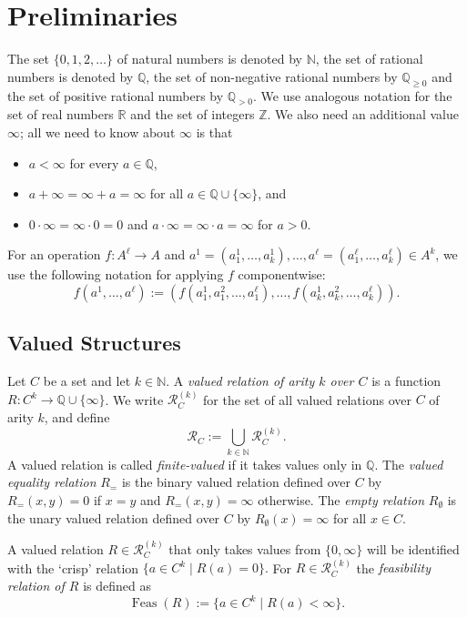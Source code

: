 \documentclass[nonacm]{acmart}
\newcommand{\Q}{\mathbb Q}
\newcommand{\Z}{\mathbb Z}
\DeclareMathOperator{\Feas}{Feas}
\newcommand{\red}[1]{\textcolor{red}{#1}}
\begin{document}
\section{Preliminaries}
\label{sect:prelims}
The set $\{0,1,2,\dots\}$ of natural numbers is denoted by ${\mathbb N}$, the set of rational numbers is denoted by $\mathbb Q$, the set of non-negative rational numbers by ${\mathbb Q}_{\geq 0}$ and the set of positive rational numbers by $\Q_{>0}$. We use analogous notation for the set of real numbers $\mathbb{R}$ and the set of integers $\Z$.
We also need an additional value $\infty$; all
we need to know about $\infty$ is that
\begin{itemize}
\item $a < \infty$ for every $a \in {\mathbb Q}$,
\item $a + \infty = \infty + a = \infty$ for all $a \in {\mathbb Q} \cup \{\infty\}$, and 
\item $0 \cdot \infty = 
\infty \cdot 0 = 0$
and $a \cdot \infty =
\infty \cdot a = \infty$ for $a > 0$. 
 \end{itemize}
For an operation  $f \colon A^{\ell} \to A$ 
and $a^1 = (a_1^1, \dots, a_k^1), \dots, a^\ell = (a_1^\ell, \dots, a_k^\ell) \in A^k$, we
use the following notation for applying $f$ componentwise: 
\[ f(a^1, \dots, a^\ell) := (f(a^1_1, a^2_1, \dots, a^\ell_1), \ldots, f(a^1_k, a^2_k, \dots, a^\ell_k)).\]

\subsection{Valued Structures}
Let $C$ be a set and let $k \in {\mathbb N}$. 
A \emph{valued relation of arity $k$ over $C$}
is 
a function $R \colon C^k \to {\mathbb Q} \cup \{\infty\}$.  
We write ${\mathscr R}_C^{(k)}$ for the set of all valued relations over $C$ of arity $k$, and define 
$${\mathscr R}_C := \bigcup_{k \in {\mathbb N}} {\mathscr R}_C^{(k)}.$$
A valued relation is called \emph{finite-valued} if it takes values only in $\Q$.
The \emph{valued equality relation} $R_=$  is the binary valued relation defined over $C$ by $R_=(x,y) = 0$ if $x=y$ and $R_=(x,y) = \infty$ otherwise. The \emph{empty relation} $R_{\emptyset}$ is the unary valued relation defined over $C$ by $R_{\emptyset}(x) = \infty$ for all $x \in C$. 

A valued relation $R \in {\mathscr R}_C^{(k)}$ that only takes values from $\{0,\infty\}$ will be identified with the `crisp' relation 
$\{a \in C^k \mid R(a) = 0\}.$
For $R \in {\mathscr R}_C^{(k)}$ the \emph{feasibility relation of $R$} is defined as
$$ \Feas(R) := \{a \in C^k \mid R(a) < \infty\}.$$
\end{document}
